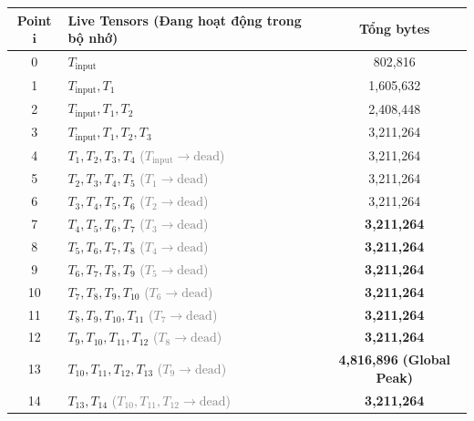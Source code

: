 \documentclass[11pt,a4paper]{article}
\begin{document}
\begin{table}[H]
\centering
\small
\begin{tabular}{clc}
\toprule
\textbf{Point $\boldsymbol{i}$} & \textbf{Live Tensors (Đang hoạt động trong bộ nhớ)} & \textbf{Tổng bytes} \\
\midrule
0  & $T_{\text{input}}$                                                                 & 802,816 \\
1  & $T_{\text{input}}, T_1$                                                             & 1,605,632 \\
2  & $T_{\text{input}}, T_1, T_2$                                                         & 2,408,448 \\
3  & $T_{\text{input}}, T_1, T_2, T_3$                                                     & 3,211,264 \\
4  & $T_1, T_2, T_3, T_4$ \quad \textcolor{gray}{\small($T_{\text{input}}\to\text{dead}$)} & 3,211,264 \\
5  & $T_2, T_3, T_4, T_5$ \quad \textcolor{gray}{\small($T_1\to\text{dead}$)}             & 3,211,264 \\
6  & $T_3, T_4, T_5, T_6$ \quad \textcolor{gray}{\small($T_2\to\text{dead}$)}             & 3,211,264 \\
7  & $T_4, T_5, T_6, T_7$ \quad \textcolor{gray}{\small($T_3\to\text{dead}$)}             & \textbf{3,211,264} \\
8  & $T_5, T_6, T_7, T_8$ \quad \textcolor{gray}{\small($T_4\to\text{dead}$)}             & \textbf{3,211,264} \\
9  & $T_6, T_7, T_8, T_9$ \quad \textcolor{gray}{\small($T_5\to\text{dead}$)}             & \textbf{3,211,264} \\
10 & $T_7, T_8, T_9, T_{10}$ \quad \textcolor{gray}{\small($T_6\to\text{dead}$)}            & \textbf{3,211,264} \\
11 & $T_8, T_9, T_{10}, T_{11}$ \quad \textcolor{gray}{\small($T_7\to\text{dead}$)}           & \textbf{3,211,264} \\
12 & $T_9, T_{10}, T_{11}, T_{12}$ \quad \textcolor{gray}{\small($T_8\to\text{dead}$)}          & \textbf{3,211,264} \\
13 & $T_{10}, T_{11}, T_{12}, T_{13}$ \quad \textcolor{gray}{\small($T_9\to\text{dead}$)}     & \textbf{4,816,896} \textbf{\textcolor{highlightred}{(Global Peak)}} \\
14 & $T_{13}, T_{14}$ \quad \textcolor{gray}{\small($T_{10}, T_{11}, T_{12}\to\text{dead}$)}    & \textbf{3,211,264} \\
\bottomrule
\end{tabular}
\end{table}
\end{document}
